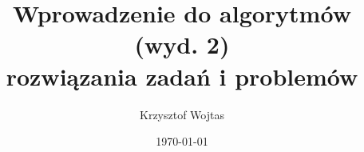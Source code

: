 \title{Wprowadzenie do algorytmów (wyd. 2)\\rozwiązania zadań i problemów}
\author{Krzysztof Wojtas}
\date{\today}

\maketitle

\tableofcontents



% 
% 
% 
